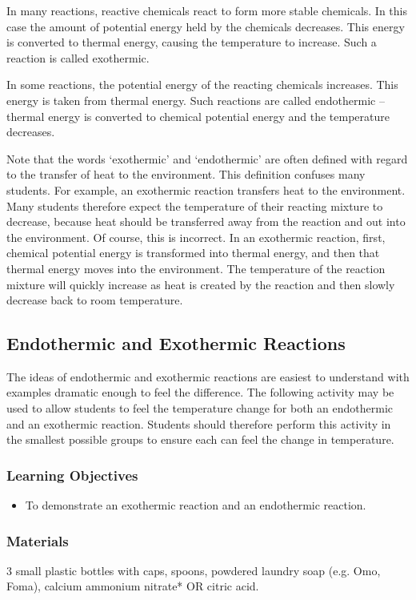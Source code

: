In many reactions, reactive chemicals react to form more stable chemicals. In this case the amount of potential energy held by the chemicals decreases. This energy is converted to thermal energy, causing the temperature to increase. Such a reaction is called exothermic.

In some reactions, the potential energy of the reacting chemicals increases. This energy is taken from thermal energy. Such reactions are called endothermic -- thermal energy is converted to chemical potential energy and the temperature decreases.

Note that the words `exothermic' and `endothermic' are often defined with regard to the transfer of heat to the environment. This definition confuses many students. For example, an exothermic reaction transfers heat to the environment. Many students therefore expect the temperature of their reacting mixture to decrease, because heat should be transferred away from the reaction and out into the environment. Of course, this is incorrect. In an exothermic reaction, first, chemical potential energy is transformed into thermal energy, and then that thermal energy moves into the environment. The temperature of the reaction mixture will quickly increase as heat is created by the reaction and then slowly decrease back to room temperature.

\subsection{Endothermic and Exothermic Reactions}

The ideas of endothermic and exothermic reactions are easiest to understand with examples dramatic enough to feel the difference. The following activity may be used to allow students to feel the temperature change for both an endothermic and an exothermic reaction. Students should therefore perform this activity in the smallest possible groups to ensure each can feel the change in temperature.

\subsubsection*{Learning Objectives}
\begin{itemize}
\item{To demonstrate an exothermic reaction and an endothermic reaction.}
\end{itemize}

\subsubsection*{Materials}
3 small plastic bottles with caps, spoons, powdered laundry soap (e.g. Omo, Foma), calcium ammonium nitrate* OR citric acid. 

